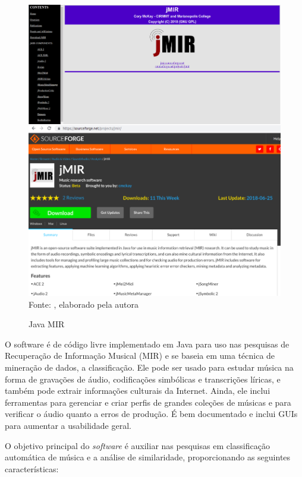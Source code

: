 \begin{figure}[!htb]
   \centering
   \caption{Java MIR}\label{fig:jmir} 
   \includegraphics[scale=0.2]{figuras/jmir.png}
   \\Fonte: \cite{jmir}, elaborado pela autora
\end{figure}

O software é de código livre implementado em Java para uso nas pesquisas de Recuperação de Informação Musical (MIR) e se baseia em uma técnica de mineração de dados, a classificação. Ele pode ser usado para estudar música na forma de gravações de áudio, codificações simbólicas e transcrições líricas, e também pode extrair informações culturais da Internet. Ainda, ele inclui ferramentas para gerenciar e criar perfis de grandes coleções de músicas e para verificar o áudio quanto a erros de produção. É bem documentado e inclui GUIs para aumentar a usabilidade geral.

O objetivo principal do \textit{software} é auxiliar nas pesquisas em classificação automática de música e a análise de similaridade, proporcionando as seguintes características:

